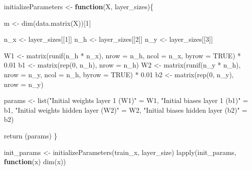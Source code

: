 \documentclass[
]{article}
\newenvironment{Shaded}{\begin{snugshade}}{\end{snugshade}}
\newcommand{\AttributeTok}[1]{\textcolor[rgb]{0.77,0.63,0.00}{#1}}
\newcommand{\ConstantTok}[1]{\textcolor[rgb]{0.00,0.00,0.00}{#1}}
\newcommand{\ControlFlowTok}[1]{\textcolor[rgb]{0.13,0.29,0.53}{\textbf{#1}}}
\newcommand{\DecValTok}[1]{\textcolor[rgb]{0.00,0.00,0.81}{#1}}
\newcommand{\FloatTok}[1]{\textcolor[rgb]{0.00,0.00,0.81}{#1}}
\newcommand{\FunctionTok}[1]{\textcolor[rgb]{0.00,0.00,0.00}{#1}}
\newcommand{\NormalTok}[1]{#1}
\newcommand{\OtherTok}[1]{\textcolor[rgb]{0.56,0.35,0.01}{#1}}
\newcommand{\SpecialCharTok}[1]{\textcolor[rgb]{0.00,0.00,0.00}{#1}}
\newcommand{\StringTok}[1]{\textcolor[rgb]{0.31,0.60,0.02}{#1}}
\begin{document}
\begin{Shaded}
\begin{Highlighting}[]
\NormalTok{initializeParameters }\OtherTok{\textless{}{-}} \ControlFlowTok{function}\NormalTok{(X, layer\_sizes)\{}

\NormalTok{  m }\OtherTok{\textless{}{-}} \FunctionTok{dim}\NormalTok{(}\FunctionTok{data.matrix}\NormalTok{(X))[}\DecValTok{1}\NormalTok{]}
  
\NormalTok{  n\_x }\OtherTok{\textless{}{-}}\NormalTok{ layer\_sizes[[}\DecValTok{1}\NormalTok{]]}
\NormalTok{  n\_h }\OtherTok{\textless{}{-}}\NormalTok{ layer\_sizes[[}\DecValTok{2}\NormalTok{]]}
\NormalTok{  n\_y }\OtherTok{\textless{}{-}}\NormalTok{ layer\_sizes[[}\DecValTok{3}\NormalTok{]]}
  
\NormalTok{  W1 }\OtherTok{\textless{}{-}} \FunctionTok{matrix}\NormalTok{(}\FunctionTok{runif}\NormalTok{(n\_h }\SpecialCharTok{*}\NormalTok{ n\_x), }\AttributeTok{nrow =}\NormalTok{ n\_h, }\AttributeTok{ncol =}\NormalTok{ n\_x, }\AttributeTok{byrow =} \ConstantTok{TRUE}\NormalTok{) }\SpecialCharTok{*} \FloatTok{0.01}
\NormalTok{  b1 }\OtherTok{\textless{}{-}} \FunctionTok{matrix}\NormalTok{(}\FunctionTok{rep}\NormalTok{(}\DecValTok{0}\NormalTok{, n\_h), }\AttributeTok{nrow =}\NormalTok{ n\_h)}
\NormalTok{  W2 }\OtherTok{\textless{}{-}} \FunctionTok{matrix}\NormalTok{(}\FunctionTok{runif}\NormalTok{(n\_y }\SpecialCharTok{*}\NormalTok{ n\_h), }\AttributeTok{nrow =}\NormalTok{ n\_y, }\AttributeTok{ncol =}\NormalTok{ n\_h, }\AttributeTok{byrow =} \ConstantTok{TRUE}\NormalTok{) }\SpecialCharTok{*} \FloatTok{0.01}
\NormalTok{  b2 }\OtherTok{\textless{}{-}} \FunctionTok{matrix}\NormalTok{(}\FunctionTok{rep}\NormalTok{(}\DecValTok{0}\NormalTok{, n\_y), }\AttributeTok{nrow =}\NormalTok{ n\_y)}
  
\NormalTok{  params }\OtherTok{\textless{}{-}} \FunctionTok{list}\NormalTok{(}\StringTok{"Initial weights layer 1 (W1)"} \OtherTok{=}\NormalTok{ W1,}
                 \StringTok{"Initial biases layer 1 (b1)"} \OtherTok{=}\NormalTok{ b1, }
                 \StringTok{"Initial weights hidden layer (W2)"} \OtherTok{=}\NormalTok{ W2,}
                 \StringTok{"Initial biases hidden layer (b2)"} \OtherTok{=}\NormalTok{ b2)}
  
  \FunctionTok{return}\NormalTok{ (params)}
\NormalTok{\}}

\NormalTok{init\_params }\OtherTok{\textless{}{-}} \FunctionTok{initializeParameters}\NormalTok{(train\_x, layer\_size)}
\FunctionTok{lapply}\NormalTok{(init\_params, }\ControlFlowTok{function}\NormalTok{(x) }\FunctionTok{dim}\NormalTok{(x))}
\end{Highlighting}
\end{Shaded}
\end{document}
